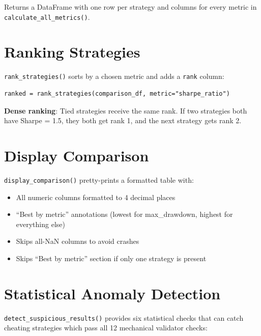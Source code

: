 \documentclass[12pt,a4paper]{report}
\theoremstyle{definition}
\newcommand{\code}[1]{\texttt{#1}}
\newcommand{\func}[1]{\texttt{#1()}}
\begin{document}
Returns a DataFrame with one row per strategy and columns for every metric in \func{calculate\_all\_metrics}.

\section{Ranking Strategies}

\func{rank\_strategies} sorts by a chosen metric and adds a \code{rank} column:

\begin{lstlisting}[caption={Ranking strategies.}]
ranked = rank_strategies(comparison_df, metric="sharpe_ratio")
\end{lstlisting}

\textbf{Dense ranking}: Tied strategies receive the same rank. If two strategies both have Sharpe = 1.5, they both get rank 1, and the next strategy gets rank 2.

\section{Display Comparison}

\func{display\_comparison} pretty-prints a formatted table with:
\begin{itemize}
    \item All numeric columns formatted to 4 decimal places
    \item ``Best by metric'' annotations (lowest for max\_drawdown, highest for everything else)
    \item Skips all-NaN columns to avoid crashes
    \item Skips ``Best by metric'' section if only one strategy is present
\end{itemize}

\section{Statistical Anomaly Detection}
\label{sec:anomaly-detection}

\func{detect\_suspicious\_results} provides six statistical checks that can catch cheating strategies which pass all 12 mechanical validator checks:
\end{document}
